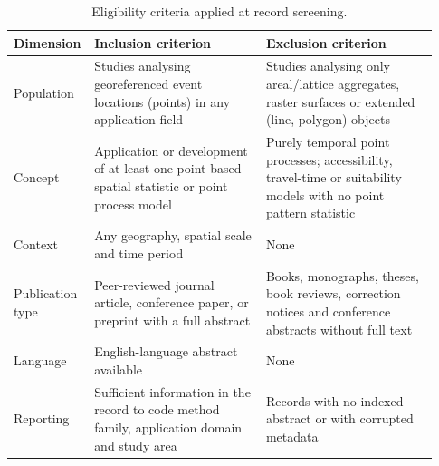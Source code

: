 \begin{table}[htbp]
\centering
\footnotesize
\caption{Eligibility criteria applied at record screening.}
\label{tab:elig}
\begin{tabular}{p{0.13\linewidth}p{0.40\linewidth}p{0.40\linewidth}}
\toprule
Dimension & Inclusion criterion & Exclusion criterion \\
\midrule
Population & Studies analysing georeferenced event locations (points) in any application field & Studies analysing only areal/lattice aggregates, raster surfaces or extended (line, polygon) objects \\
Concept & Application or development of at least one point-based spatial statistic or point process model & Purely temporal point processes; accessibility, travel-time or suitability models with no point pattern statistic \\
Context & Any geography, spatial scale and time period & None \\
Publication type & Peer-reviewed journal article, conference paper, or preprint with a full abstract & Books, monographs, theses, book reviews, correction notices and conference abstracts without full text \\
Language & English-language abstract available & None \\
Reporting & Sufficient information in the record to code method family, application domain and study area & Records with no indexed abstract or with corrupted metadata \\
\bottomrule
\end{tabular}
\end{table}
